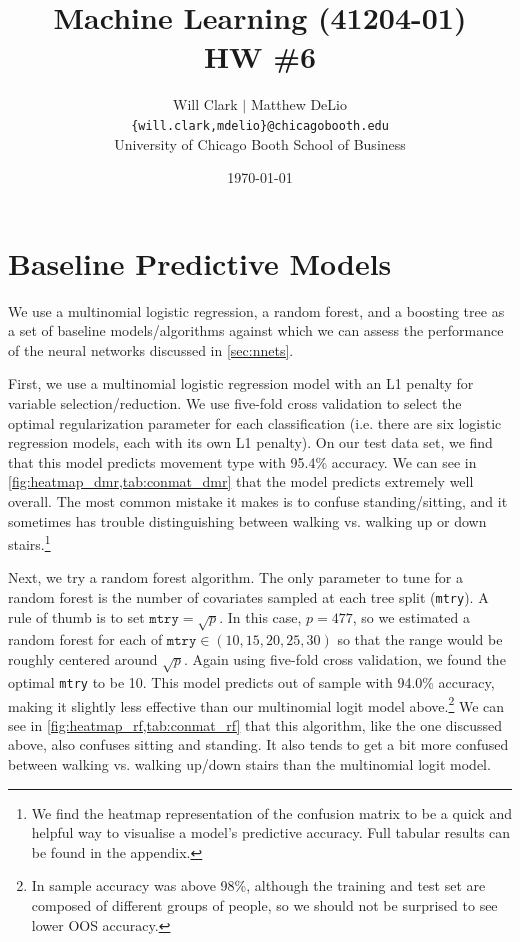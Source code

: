 



\title{Machine Learning (41204-01)\\HW \#6}
\author{Will Clark $\vert$ Matthew DeLio \\
\texttt{\{will.clark,mdelio\}@chicagobooth.edu} \\
University of Chicago Booth School of Business}
\date{\today}
\maketitle

\section{Baseline Predictive Models} \label{sec:baseline}

We use a multinomial logistic regression, a random forest, and a boosting tree as a set of baseline models/algorithms against which we can assess the performance of the neural networks discussed in \vref{sec:nnets}. 

First, we use a multinomial logistic regression model with an L1 penalty for variable selection/reduction. We use five-fold cross validation to select the optimal regularization parameter for each classification (i.e. there are six logistic regression models, each with its own L1 penalty). On our test data set, we find that this model predicts movement type with 95.4\% accuracy. We can see in \vref{fig:heatmap_dmr,tab:conmat_dmr} that the model predicts extremely well overall. The most common mistake it makes is to confuse standing/sitting, and it sometimes has trouble distinguishing between walking vs. walking up or down stairs.\footnote{We find the heatmap representation of the confusion matrix to be a quick and helpful way to visualise a model's predictive accuracy. Full tabular results can be found in the appendix.}

Next, we try a random forest algorithm. The only parameter to tune for a random forest is the number of covariates sampled at each tree split (\texttt{mtry}). A rule of thumb is to set $\texttt{mtry}=\sqrt{p}$. In this case, $p=477$, so we estimated a random forest for each of $\texttt{mtry}\in(10, 15, 20, 25, 30)$ so that the range would be roughly centered around $\sqrt{p}$. Again using five-fold cross validation, we found the optimal \texttt{mtry} to be 10. This model predicts out of sample with 94.0\% accuracy, making it slightly less effective than our multinomial logit model above.\footnote{In sample accuracy was above 98\%, although the training and test set are composed of different groups of people, so we should not be surprised to see lower OOS accuracy.} We can see in \vref{fig:heatmap_rf,tab:conmat_rf} that this algorithm, like the one discussed above, also confuses sitting and standing. It also tends to get a bit more confused between walking vs. walking up/down stairs than the multinomial logit model.


